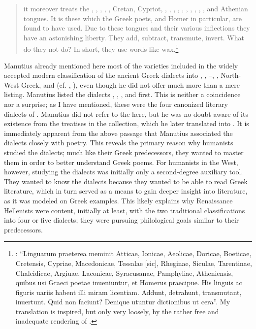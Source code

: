 \begin{quote}
it moreover treats the , , , , , Cretan, Cypriot, , , , , , , , , , , and Athenian tongues. It is these which the Greek poets, and Homer in particular, are found to have used. Due to these tongues and their various inflections they have an astonishing liberty. They add, subtract, transmute, invert. What do they not do? In short, they use words like wax.\footnote{\citet[*.ii\textsc{\textsuperscript{v}}]{Manutius1496Aldus}: “Linguarum praeterea meminit Atticae, Ionicae, Aeolicae, Doricae, Boeticae, Cretensis, Cypriae, Macedonicae, Tessalae [sic], Rheginae, Siculae, Tarentinae, Chalcidicae, Argiuae, Laconicae, Syracusanae, Pamphyliae, Atheniensis, quibus usi Graeci poetae inueniuntur, et Homerus praecipue. His linguis ac figuris uariis habent illi miram licentiam. Addunt, detrahunt, transmutant, inuertunt. Quid non faciunt? Denique utuntur dictionibus ut cera”. My translation is inspired, but only very loosely, by the rather free and inadequate rendering of \citet[12]{Bean1958}.} 
\end{quote}

Manutius already mentioned here most of the varieties included in the widely accepted modern classification of the ancient Greek dialects into , , –, , North-West Greek, and  (cf. , ), even though he did not offer much more than a mere listing. Manutius listed the dialects , , , and  first. This is neither a coincidence nor a surprise; as I have mentioned, these were the four canonized literary dialects of . Manutius did not refer to the  here, but he was no doubt aware of its existence from the treatises in the collection, which he later translated into . It is immediately apparent from the above passage that Manutius associated the dialects closely with poetry. This reveals the primary reason why humanists studied the dialects; much like their Greek predecessors, they wanted to master them in order to better understand Greek poems. For humanists in the  West, however, studying the dialects was initially only a second-degree auxiliary tool. They wanted to know the dialects because they wanted to be able to read Greek literature, which in turn served as a means to gain deeper insight into  literature, as it was modeled on Greek examples. This likely explains why Renaissance Hellenists were content, initially at least, with the two traditional classifications into four or five dialects; they were pursuing philological goals similar to their predecessors.

